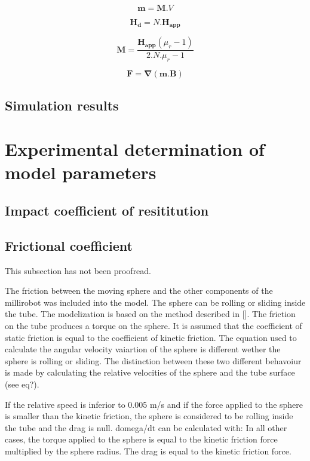 \documentclass[letterpaper, 10 pt, conference]{ieeeconf}  %
\begin{document}
\begin{equation}
\mathbf{m}=\mathbf{M}.V
\label{mag}
\end{equation}

\begin{equation}
\mathbf{H_d}=N.\mathbf{H_{app}}
\label{hd}
\end{equation}

\begin{equation}
\mathbf{M}=\frac{\mathbf{H_{app}}\left ( \mu_r-1  \right )}{2.N.\mu_r-1}
\label{mag2}
\end{equation}

\begin{equation}
\mathbf{F}=\mathbf{\nabla}(\mathbf{m}.\mathbf{B})
\label{force}
\end{equation}

\subsection{Simulation results}


\section{Experimental determination of model parameters}

\subsection{Impact coefficient of resititution}

\subsection{Frictional coefficient}

This subsection has not been proofread.

The friction between the moving sphere and the other components of the millirobot was included into the model. The sphere can be rolling or sliding inside the tube. The modelization is based on the method described in []. 
The friction on the tube produces a torque on the sphere. It is assumed that the coefficient of static friction is equal to the coefficient of kinetic friction. The equation used to calculate the angular velocity vaiartion of the sphere is different wether the sphere is rolling or sliding. The distinction between these two different behavoiur is made by calculating the relative velocities of the sphere and the tube surface (see eq?). \par
If the relative speed is inferior to 0.005 m/s and if the force applied to the sphere is smaller than the kinetic friction, the sphere is considered to be rolling inside the tube and the drag is null. domega/dt can be calculated with:
In all other cases, the torque applied to the sphere is equal to the kinetic friction force multiplied by the sphere radius. The drag is equal to the kinetic friction force.
\end{document}
